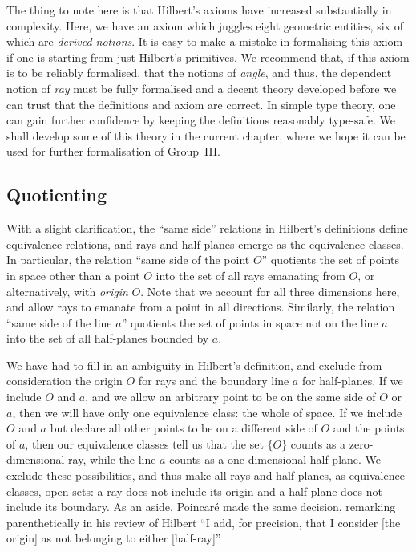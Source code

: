 The thing to note here is that Hilbert's axioms have increased substantially in complexity. Here, we have an axiom which juggles eight geometric entities, six of which are \emph{derived notions}. It is easy to make a mistake in formalising this axiom if one is starting from just Hilbert's primitives. We recommend that, if this axiom is to be reliably formalised, that the notions of \emph{angle}, and thus, the dependent notion of \emph{ray} must be fully formalised and a decent theory developed before we can trust that the definitions and axiom are correct. In simple type theory, one can gain further confidence by keeping the definitions reasonably type-safe. We shall develop some of this theory in the current chapter, where we hope it can be used for further formalisation of Group~III.

\subsection{Quotienting}\label{sec:RayQuotienting}
With a slight clarification, the ``same side'' relations in Hilbert's definitions define equivalence relations, and rays and half-planes emerge as the equivalence classes. In particular, the relation ``same side of the point $O$'' quotients the set of points in space other than a point $O$ into the set of all rays emanating from $O$, or alternatively, with \emph{origin} $O$. Note that we account for all three dimensions here, and allow rays to emanate from a point in all directions. Similarly, the relation ``same side of the line $a$'' quotients the set of points in space not on the line $a$ into the set of all half-planes bounded by $a$. 

We have had to fill in an ambiguity in Hilbert's definition, and exclude from consideration the origin $O$ for rays and the boundary line $a$ for half-planes. If we include $O$ and $a$, and we allow an arbitrary point to be on the same side of $O$ or $a$, then we will have only one equivalence class: the whole of space. If we include $O$ and $a$ but declare all other points to be on a different side of $O$ and the points of $a$, then our equivalence classes tell us that the set $\{O\}$ counts as a zero-dimensional ray, while the line $a$ counts as a one-dimensional half-plane. We exclude these possibilities, and thus make all rays and half-planes, as equivalence classes, open sets: a ray does not include its origin and a half-plane does not include its boundary. As an aside, Poincar\'{e} made the same decision, remarking parenthetically in his review of Hilbert ``I add, for precision, that I consider [the origin] as not belonging to either [half-ray]''~\cite{PoincareReview}.

